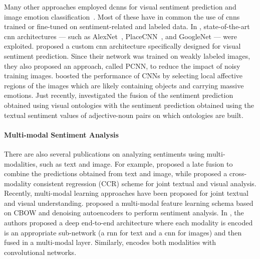 Many other approaches employed \glspl{dcnn} for visual sentiment prediction and image emotion classification~\cite{campos2017pixels,chen2014deepsentibank,islam2016visual,rao2016learning,you2015robust,xu2014visual}.
Most of these have in common the use of \glspl{cnn} trained or fine-tuned on sentiment-related and labeled data.
In \cite{campos2017pixels,chen2014deepsentibank,islam2016visual,jou2015visual}, %
state-of-the-art \gls{cnn} architectures --- such as AlexNet~\cite{krizhevsky2012imagenet}, PlaceCNN~\cite{zhou2014learning}, and GoogleNet \cite{szegedy2015going} --- were exploited.
\citet{you2015robust} proposed a custom \gls{cnn} architecture specifically designed for visual sentiment prediction.
Since their network was trained on weakly labeled images, they also proposed an approach, called PCNN, to reduce the impact of noisy training images. %
\citet{sun2016discovering} boosted the performance of CNNs by selecting local affective regions of the images which are likely containing objects and carrying massive emotions. %
Just recently, \citet{li2018image} investigated the fusion of the sentiment prediction obtained using visual ontologies with the sentiment prediction obtained using the textual sentiment values of adjective-noun pairs on which ontologies are built.


\paragraph{Multi-modal Sentiment Analysis}
There are also several publications on analyzing sentiments using multi-modalities, such as text and image.
For example, \citet{cao2016cross} proposed a late fusion to combine the predictions obtained from text and image, while \citet{you2016cross} proposed a cross-modality consistent regression (CCR) scheme for joint textual and visual analysis.
Recently, multi-modal learning approaches have been proposed for joint textual and visual understanding.
\citet{baecchi2016multimodal} proposed a multi-modal feature learning schema based on CBOW and denoising autoencoders to perform sentiment analysis.
In \cite{mao2014deep}, the authors proposed a deep end-to-end architecture where each modality is encoded is an appropriate sub-network (a \gls{rnn} for text and a \gls{cnn} for images) and then fused in a multi-modal layer.
Similarly, \citet{ma2015multimodal} encodes both modalities with convolutional networks.

